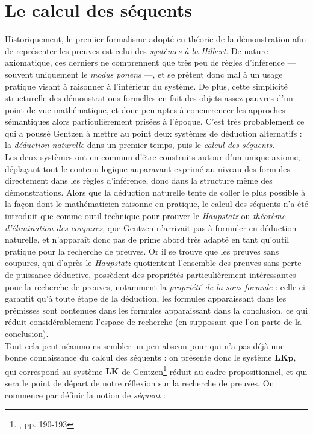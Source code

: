\documentclass[11pt]{report}
\begin{document}
\chapter{Le calcul des séquents}

Historiquement, le premier formalisme adopté en théorie de la démonstration afin de représenter les preuves est celui des \emph{systèmes à la Hilbert}. De nature axiomatique, ces derniers ne comprennent que très peu de règles d'inférence --- souvent uniquement le \textit{modus ponens} ---, et se prêtent donc mal à un usage pratique visant à raisonner à l'intérieur du système. De plus, cette simplicité structurelle des démonstrations formelles en fait des objets assez pauvres d'un point de vue mathématique, et donc peu aptes à concurrencer les approches sémantiques alors particulièrement prisées à l'époque. C'est très probablement ce qui a poussé Gentzen à mettre au point deux systèmes de déduction alternatifs : la \emph{déduction naturelle} dans un premier temps, puis le \emph{calcul des séquents}.\\

Les deux systèmes ont en commun d'être construits autour d'un unique axiome, déplaçant tout le contenu logique auparavant exprimé au niveau des formules directement dans les règles d'inférence, donc dans la structure même des démonstrations. Alors que la déduction naturelle tente de coller le plus possible à la façon dont le mathématicien raisonne en pratique, le calcul des séquents n'a été introduit que comme outil technique pour prouver le \textit{Haupstatz} ou \emph{théorème d'élimination des coupures}, que Gentzen n'arrivait pas à formuler en déduction naturelle, et n'apparaît donc pas de prime abord très adapté en tant qu'outil pratique pour la recherche de preuves. Or il se trouve que les preuves sans coupures, qui d'après le \textit{Haupstatz} quotientent l'ensemble des preuves sans perte de puissance déductive, possèdent des propriétés particulièrement intéressantes pour la recherche de preuves, notamment la \emph{propriété de la sous-formule} : celle-ci garantit qu'à toute étape de la déduction, les formules apparaissant dans les prémisses sont contenues dans les formules apparaissant dans la conclusion, ce qui réduit considérablement l'espace de recherche (en supposant que l'on parte de la conclusion).\\

Tout cela peut néanmoins sembler un peu abscon pour qui n'a pas déjà une bonne connaissance du calcul des séquents : on présente donc le système $\mathbf{LKp}$, qui correspond au système $\mathbf{LK}$ de Gentzen\footnote{\cite{Gen35}, pp. 190-193} réduit au cadre propositionnel, et qui sera le point de départ de notre réflexion sur la recherche de preuves. On commence par définir la notion de \emph{séquent} :
\end{document}
